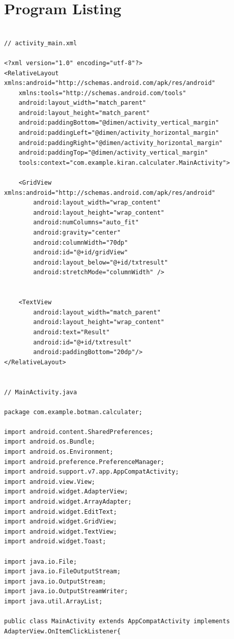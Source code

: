 \documentclass[10pt,a4paper]{article}
\begin{document}
\newpage
\section{Program Listing}
\begin{lstlisting}

// activity_main.xml

<?xml version="1.0" encoding="utf-8"?>
<RelativeLayout xmlns:android="http://schemas.android.com/apk/res/android"
    xmlns:tools="http://schemas.android.com/tools"
    android:layout_width="match_parent"
    android:layout_height="match_parent"
    android:paddingBottom="@dimen/activity_vertical_margin"
    android:paddingLeft="@dimen/activity_horizontal_margin"
    android:paddingRight="@dimen/activity_horizontal_margin"
    android:paddingTop="@dimen/activity_vertical_margin"
    tools:context="com.example.kiran.calculater.MainActivity">

    <GridView  xmlns:android="http://schemas.android.com/apk/res/android"
        android:layout_width="wrap_content"
        android:layout_height="wrap_content"
        android:numColumns="auto_fit"
        android:gravity="center"
        android:columnWidth="70dp"
        android:id="@+id/gridView"
        android:layout_below="@+id/txtresult"
        android:stretchMode="columnWidth" />


    <TextView
        android:layout_width="match_parent"
        android:layout_height="wrap_content"
        android:text="Result"
        android:id="@+id/txtresult"
        android:paddingBottom="20dp"/>
</RelativeLayout>


// MainActivity.java

package com.example.botman.calculater;

import android.content.SharedPreferences;
import android.os.Bundle;
import android.os.Environment;
import android.preference.PreferenceManager;
import android.support.v7.app.AppCompatActivity;
import android.view.View;
import android.widget.AdapterView;
import android.widget.ArrayAdapter;
import android.widget.EditText;
import android.widget.GridView;
import android.widget.TextView;
import android.widget.Toast;

import java.io.File;
import java.io.FileOutputStream;
import java.io.OutputStream;
import java.io.OutputStreamWriter;
import java.util.ArrayList;

public class MainActivity extends AppCompatActivity implements 
AdapterView.OnItemClickListener{


\end{lstlisting}
\end{document}
